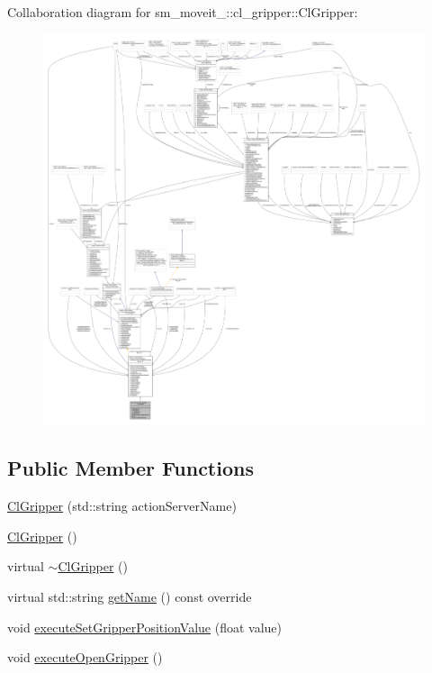 Collaboration diagram for sm\+\_\+moveit\+\_\+:\+:cl\+\_\+gripper\+:\+:Cl\+Gripper\+:
\nopagebreak
\begin{figure}[H]
\begin{center}
\leavevmode
\includegraphics[width=350pt]{classsm__moveit__4_1_1cl__gripper_1_1ClGripper__coll__graph}
\end{center}
\end{figure}
\subsection*{Public Member Functions}
\begin{DoxyCompactItemize}
\item 
\hyperlink{classsm__moveit__4_1_1cl__gripper_1_1ClGripper_ac34c18b6f4536a98f274a509d2d32654}{Cl\+Gripper} (std\+::string action\+Server\+Name)
\item 
\hyperlink{classsm__moveit__4_1_1cl__gripper_1_1ClGripper_a4dcf3b616e999101f67f2f11a24e6826}{Cl\+Gripper} ()
\item 
virtual \hyperlink{classsm__moveit__4_1_1cl__gripper_1_1ClGripper_a4a14579e9b4c82743685e66818349b66}{$\sim$\+Cl\+Gripper} ()
\item 
virtual std\+::string \hyperlink{classsm__moveit__4_1_1cl__gripper_1_1ClGripper_a36193b0a812e86d3bfff8c3d6222d78d}{get\+Name} () const override
\item 
void \hyperlink{classsm__moveit__4_1_1cl__gripper_1_1ClGripper_a671a49db97f4c4c254952c6116b7d8e4}{execute\+Set\+Gripper\+Position\+Value} (float value)
\item 
void \hyperlink{classsm__moveit__4_1_1cl__gripper_1_1ClGripper_a018d2db65109621f290f38ffbde49369}{execute\+Open\+Gripper} ()
\end{DoxyCompactItemize}
